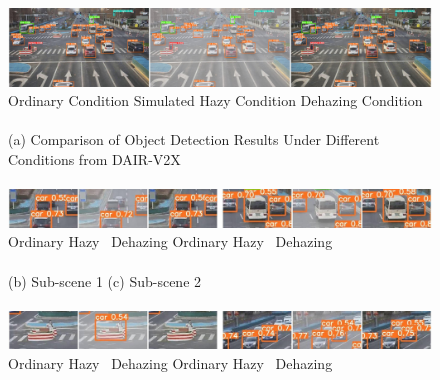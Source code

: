 \documentclass[lettersize,journal]{IEEEtran}
\begin{document}
\begin{figure}[pht]
    \centering
    
    \includegraphics[width=\textwidth]{pic2.jpg}
    Ordinary Condition \qquad\qquad\qquad\qquad Simulated Hazy Condition \qquad\qquad\qquad\quad Dehazing Condition\\

    \quad \\
    
    (a) Comparison of Object Detection Results Under Different Conditions from DAIR-V2X\\

    \quad \\
    
    \includegraphics[width=\textwidth]{pic3.jpg}
    Ordinary \qquad\qquad\quad Hazy \qquad\qquad\quad\ Dehazing 
    \qquad \qquad \quad
    Ordinary \qquad\qquad\quad Hazy \qquad\qquad\quad\ Dehazing\\

    \quad \\
    
    (b) Sub-scene 1\qquad\qquad\qquad\qquad\qquad\qquad\qquad\qquad\qquad\quad\; (c) Sub-scene 2\\

    \quad \\

    \includegraphics[width=\textwidth]{pic4.jpg}
    Ordinary \qquad\qquad\quad Hazy \qquad\qquad\quad\ Dehazing 
    \qquad \qquad \quad
    Ordinary \qquad\qquad\quad Hazy \qquad\qquad\quad\ Dehazing\\
    
    \quad \\
    

\end{figure}
\end{document}
